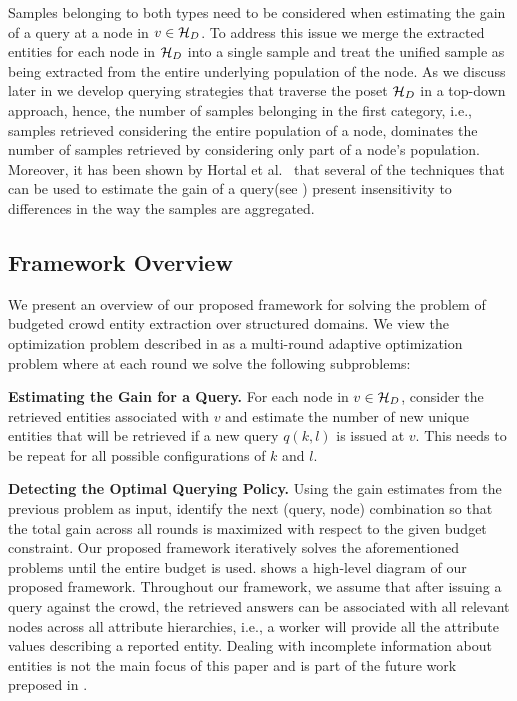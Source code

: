 Samples belonging to both types need to be considered when estimating the gain of a query at a node in $v \in \mathcal{H}_D$. To address this issue we merge the extracted entities for each node in $\mathcal{H}_D$ into a single sample and treat the unified sample as being extracted from the entire underlying population of the node. As we discuss later in  we develop querying strategies that traverse the poset $\mathcal{H}_D$ in a top-down approach, hence, the number of samples belonging in the first category, i.e., samples retrieved considering the entire population of a node, dominates the number of samples retrieved by considering only part of a node's population. Moreover, it has been shown by Hortal et al.~\cite{hortal2006evaluating} that several of the techniques that can be used to estimate the gain of a query(see ) present insensitivity to differences in the way the samples are aggregated.

\subsection{Framework Overview}
\label{sec:framework}
We present an overview of our proposed framework for solving the problem of budgeted crowd entity extraction over structured domains. We view the optimization problem described in  as a multi-round adaptive optimization problem where at each round we solve the following subproblems: 
\squishlist 
\item \textbf{Estimating the Gain for a Query.} For each node in $v \in \mathcal{H}_D$, consider the retrieved entities associated with $v$ and estimate the number of new unique entities that will be retrieved if a new query $q(k,l)$ is issued at $v$. This needs to be repeat for all possible configurations of $k$ and $l$.
\item \textbf{Detecting the Optimal Querying Policy.} Using the gain estimates from the previous problem as input, identify the next (query, node) combination so that the total gain across all rounds is maximized with respect to the given budget constraint. 
\squishend
Our proposed framework iteratively solves the aforementioned problems until the entire budget is used.  shows a high-level diagram of our proposed framework. Throughout our framework, we assume that after issuing a query against the crowd, the retrieved answers can be associated with all relevant nodes across all attribute hierarchies, i.e., a worker will provide all the attribute values describing a reported entity. Dealing with incomplete information about entities is not the main focus of this paper and is part of the future work preposed in .

